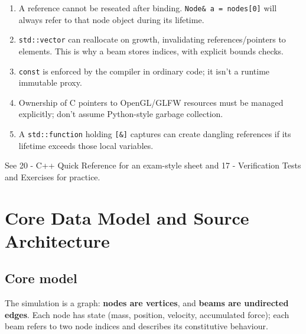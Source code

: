 \documentclass[
  10pt,
  a4paper,
]{article}
\providecommand{\tightlist}{%
  \setlength{\itemsep}{0pt}\setlength{\parskip}{0pt}}
\begin{document}
\begin{enumerate}
\def\labelenumi{\arabic{enumi}.}
\tightlist
\item
  A reference cannot be reseated after binding.
  \texttt{Node\&\ a\ =\ nodes{[}0{]}} will always refer to that node
  object during its lifetime.
\item
  \texttt{std::vector} can reallocate on growth, invalidating
  references/pointers to elements. This is why a beam stores indices,
  with explicit bounds checks.
\item
  \texttt{const} is enforced by the compiler in ordinary code; it isn't
  a runtime immutable proxy.
\item
  Ownership of C pointers to OpenGL/GLFW resources must be managed
  explicitly; don't assume Python-style garbage collection.
\item
  A \texttt{std::function} holding \texttt{{[}\&{]}} captures can create
  dangling references if its lifetime exceeds those local variables.
\end{enumerate}

See 20 - C++ Quick Reference for an exam-style sheet and 17 -
Verification Tests and Exercises for practice.

\newpage

\section{Core Data Model and Source
Architecture}\label{core-data-model-and-source-architecture}

\subsection{Core model}\label{core-model}

The simulation is a graph: \textbf{nodes are vertices}, and
\textbf{beams are undirected edges}. Each node has state (mass,
position, velocity, accumulated force); each beam refers to two node
indices and describes its constitutive behaviour.
\end{document}
